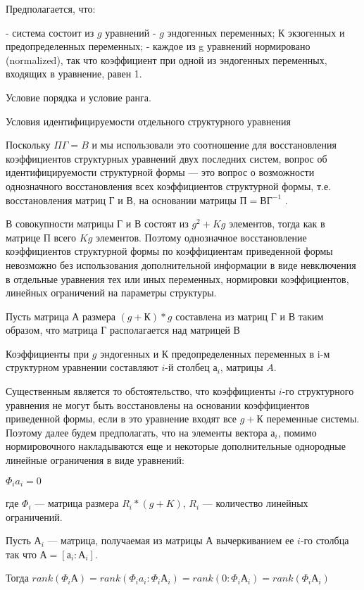 \documentclass[a4paper,8pt]{article} %
\begin{document}
Предполагается, что:

- система состоит из $g$ уравнений
- $g$ эндогенных переменных; $К$ экзогенных и предопределенных переменных;
- каждое из g уравнений нормировано (normalized), так что коэффициент при одной из эндогенных переменных, входящих в уравнение, равен 1.


Условие порядка  и  условие  ранга.  

Условия идентифицируемости отдельного структурного уравнения

Поскольку $ \Pi \Gamma = B  $ и мы использовали это соотношение для восстановления коэффициентов структурных уравнений двух последних систем, вопрос об идентифицируемости структурной формы — это вопрос о возможности однозначного восстановления всех коэффициентов структурной формы, т.е. восстановления матриц $Г$ и $В$, на основании матрицы $П= ВГ^{-1}$ . 

В совокупности матрицы  $Г$ и $В$ состоят из $g^2 + Kg$ элементов, тогда как в матрице П всего $Kg$ элементов. Поэтому однозначное восстановление коэффициентов структурной формы по коэффициентам приведенной формы невозможно без использования дополнительной информации в виде невключения в отдельные уравнения тех или иных переменных, нормировки коэффициентов, линейных
ограничений на параметры структуры.



Пусть матрица $А$ размера $(g + К) * g$ составлена из матриц $Г$ и $В$ таким образом, что матрица $Г$ располагается над матрицей $В$

Коэффициенты при $g$ эндогенных и $К$ предопределенных переменных в i-м
структурном уравнении составляют $i$-й столбец $а_i$, матрицы $A$.

Существенным является то обстоятельство, что коэффициенты $i$-го структурного уравнения не могут быть восстановлены на основании коэффициентов приведенной формы, если в это уравнение входят все $g + К$ переменные системы.
Поэтому далее будем предполагать, что на элементы вектора $а_i$, помимо
нормировочного накладываются еще и некоторые дополнительные однородные линейные ограничения в виде уравнений:

$\Phi_i a_i = 0 $

где $\Phi_i $ — матрица размера $R_i * (g+K) $, $R_i$ — количество линейных ограничений.


Пусть $А_i$ — матрица, получаемая из матрицы $А$ вычеркиванием ее $i$-го столбца так что $А = [а_i : А_i]$.

Тогда  $ rank (\Phi_i А) =  rank (\Phi_i a_i : \Phi_i А_i ) = rank (0  : \Phi_i А_i ) = rank (\Phi_i А_i ) $ 
\end{document}
